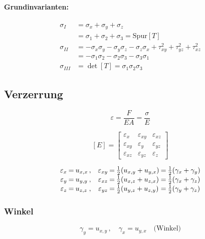 \documentclass{article}
\begin{document}
\begin{multicols*}{4}
					\paragraph{Grundinvarianten:} %
						\begin{align*}
							\sigma_I &= \sigma_x + \sigma_y + \sigma_z \\
							&= \sigma_1 + \sigma_2 + \sigma_3 = \text{Spur}[T] \\
							\sigma_{II} &= -\sigma_x \sigma_y - \sigma_y \sigma_z - \sigma_z \sigma_x + \tau_{xy}^2 + \tau_{yz}^2 + \tau_{xz}^2 \\
							&= - \sigma_1 \sigma_2 - \sigma_2 \sigma_3 - \sigma_3 \sigma_1 \\
							\sigma_{III} &= \det[T] = \sigma_1 \sigma_2 \sigma_3
						\end{align*}
			\subsection{Verzerrung} %
				\[
					\varepsilon = \frac{F}{EA} = \frac{\sigma}{E}
				\]
				
				\[
					[E] = \left[\begin{array}{lll}
						\varepsilon_x & \varepsilon_{xy} & \varepsilon_{xz} \\
						\varepsilon_{xy} & \varepsilon_y & \varepsilon_{yz} \\
						\varepsilon_{xz} & \varepsilon_{yz} & \varepsilon_z
					\end{array}\right]
				\]
				
				\[
					\begin{array}{r@{\:=\:}l@{\, , \quad}r@{\:=\:}l@{\:=\:}l}
						\varepsilon_x & u_{x,x} & \varepsilon_{xy} & \frac{1}{2} (u_{x,y} + u_{y,x}) & \frac{1}{2} (\gamma_x + \gamma_y) \\ [1pt]
						\varepsilon_y & u_{y,y} & \varepsilon_{xz} & \frac{1}{2} (u_{x,z} + u_{z,x}) & \frac{1}{2} (\gamma_x + \gamma_z) \\ [1pt]
						\varepsilon_z & u_{z,z} & \varepsilon_{yz} & \frac{1}{2} (u_{y,z} + u_{z,y}) & \frac{1}{2} (\gamma_y + \gamma_z)
					\end{array}
				\]
				
				\subsubsection{Winkel} %
					\[
						\gamma_y = u_{x,y} \, ,\quad 
						\gamma_x = u_{y,x} \quad \text{(Winkel)}
					\]
					

\end{multicols*}
\end{document}
